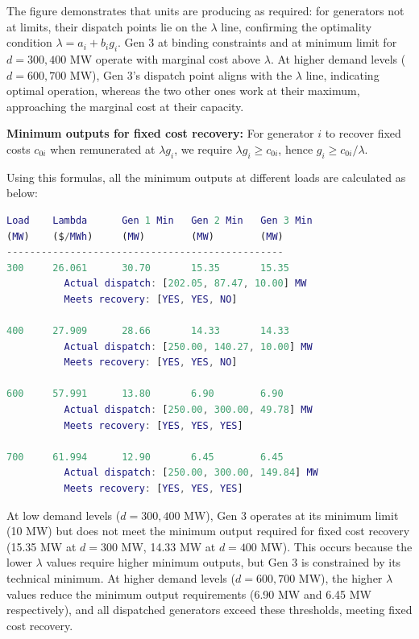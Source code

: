 \documentclass{article}
\begin{document}
The figure demonstrates that units are producing as required: for generators not at limits, their dispatch points lie on the $\lambda$ line, confirming the optimality condition $\lambda = a_i + b_i g_i$. Gen 3 at binding constraints and at minimum limit for $d=300,400$ MW operate with marginal cost above $\lambda$. At higher demand levels ($d=600,700$ MW), Gen 3's dispatch point aligns with the $\lambda$ line, indicating optimal operation, whereas the two other ones work at their maximum, approaching the marginal cost at their capacity.




\textbf{Minimum outputs for fixed cost recovery:} For generator $i$ to recover fixed costs $c_{0i}$ when remunerated at $\lambda g_i$, we require $\lambda g_i \geq c_{0i}$, hence $g_i \geq c_{0i}/\lambda$. 

Using this formulas, all the minimum outputs at different loads are calculated as below:


\begin{lstlisting}[language=Matlab]
Load    Lambda      Gen 1 Min   Gen 2 Min   Gen 3 Min   
(MW)    ($/MWh)     (MW)        (MW)        (MW)        
------------------------------------------------
300     26.061      30.70       15.35       15.35       
          Actual dispatch: [202.05, 87.47, 10.00] MW
          Meets recovery: [YES, YES, NO]

400     27.909      28.66       14.33       14.33       
          Actual dispatch: [250.00, 140.27, 10.00] MW
          Meets recovery: [YES, YES, NO]

600     57.991      13.80       6.90        6.90        
          Actual dispatch: [250.00, 300.00, 49.78] MW
          Meets recovery: [YES, YES, YES]

700     61.994      12.90       6.45        6.45        
          Actual dispatch: [250.00, 300.00, 149.84] MW
          Meets recovery: [YES, YES, YES]
\end{lstlisting}


At low demand levels ($d=300,400$ MW), Gen 3 operates at its minimum limit (10 MW) but does not meet the minimum output required for fixed cost recovery (15.35 MW at $d=300$ MW, 14.33 MW at $d=400$ MW). This occurs because the lower $\lambda$ values require higher minimum outputs, but Gen 3 is constrained by its technical minimum. At higher demand levels ($d=600,700$ MW), the higher $\lambda$ values reduce the minimum output requirements (6.90 MW and 6.45 MW respectively), and all dispatched generators exceed these thresholds, meeting fixed cost recovery.
\end{document}
